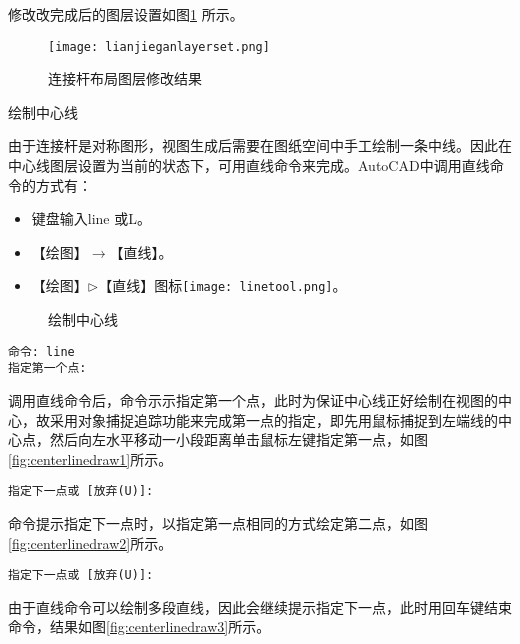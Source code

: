 \begin{procedure}
修改改完成后的图层设置如图\ref{fig:lianjieganlayerset} 所示。
\begin{figure}[htbp]
\centering
\texttt{[image: lianjieganlayerset.png]}
\caption{连接杆布局图层修改结果}\label{fig:lianjieganlayerset}
\end{figure}
\item 绘制中心线

由于连接杆是对称图形，视图生成后需要在图纸空间中手工绘制一条中线。因此在中心线图层设置为当前的状态下，可用直线命令来完成。AutoCAD中调用直线命令的方式有：
\begin{itemize}
\item 键盘输入line 或L。
\item 【绘图】$\rightarrow$【直线】。
\item 【绘图】$\triangleright$【直线】图标\texttt{[image: linetool.png]}。
\end{itemize}

\begin{figure}[htbp]
\centering
{}\hspace{20pt}
\hspace{20pt}
\caption{绘制中心线}
\end{figure}

\begin{lstlisting}
命令: line
指定第一个点:
\end{lstlisting}

调用直线命令后，命令示示指定第一个点，此时为保证中心线正好绘制在视图的中心，故采用对象捕捉追踪功能来完成第一点的指定，即先用鼠标捕捉到左端线的中心点，然后向左水平移动一小段距离单击鼠标左键指定第一点，如图\ref{fig:centerlinedraw1}所示。
\begin{lstlisting}
指定下一点或 [放弃(U)]:
\end{lstlisting}

命令提示指定下一点时，以指定第一点相同的方式绘定第二点，如图\ref{fig:centerlinedraw2}所示。
\begin{lstlisting}
指定下一点或 [放弃(U)]:
\end{lstlisting}

由于直线命令可以绘制多段直线，因此会继续提示指定下一点，此时用回车键结束命令，结果如图\ref{fig:centerlinedraw3}所示。
\end{procedure}
